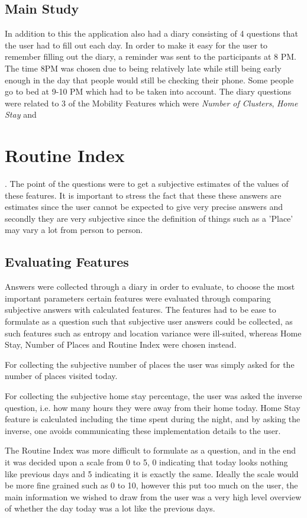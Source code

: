 \subsection{Main Study}
In addition to this the application also had a diary consisting of 4 questions that the user had to fill out each day. In order to make it easy for the user to remember filling out the diary, a reminder was sent to the participants at 8 PM. The time 8PM was chosen due to being relatively late while still being early enough in the day that people would still be checking their phone. Some people go to bed at 9-10 PM which had to be taken into account. The diary questions were related to 3 of the Mobility Features which were \textit{Number of Clusters}, \textit{Home Stay} and \section{Routine Index}. The point of the questions were to get a subjective estimates of the values of these features. It is important to stress the fact that these these answers are estimates since the user cannot be expected to give very precise answers and secondly they are very subjective since the definition of things such as a 'Place' may vary a lot from person to person.

\subsection{Evaluating Features}
Answers were collected through a diary in order to evaluate, to choose the most important parameters certain features were evaluated through comparing subjective answers with calculated features. The features had to be ease to formulate as a question such that subjective user answers could be collected, as such features such as entropy and location variance were ill-suited, whereas Home Stay, Number of Places and Routine Index were chosen instead. 

For collecting the subjective number of places the user was simply asked for the number of places visited today. 

For collecting the subjective home stay percentage, the user was asked the inverse question, i.e. how many hours they were away from their home today. Home Stay feature is calculated including the time spent during the night, and by asking the inverse, one avoids communicating these implementation details to the user. 

The Routine Index was more difficult to formulate as a question, and in the end it was decided upon a scale from 0 to 5, 0 indicating that today looks nothing like previous days and 5 indicating it is exactly the same. Ideally the scale would be more fine grained such as 0 to 10, however this put too much on the user, the main information we wished to draw from the user was a very high level overview of whether the day today was a lot like the previous days.

